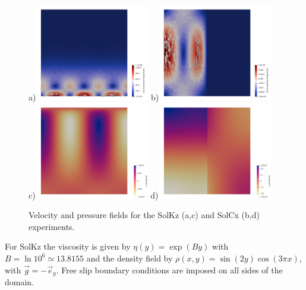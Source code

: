 \documentclass[a4paper,12pt]{article}
\begin{document}
\begin{figure}
\centering
a)\includegraphics[width=5cm]{../images/fields/vel_solkz}
b)\includegraphics[width=5cm]{../images/fields/vel_solcx}\\
c)\includegraphics[width=5cm]{../images/fields/press_solkz}
d)\includegraphics[width=5cm]{../images/fields/press_solcx}
\caption{Velocity and pressure fields for the SolKz (a,c) and SolCx (b,d) 
experiments.} \label{fig:sols}
\end{figure}

For SolKz the viscosity is given by $\eta(y)=\exp(By)$ with $B=\ln 10^6 \simeq 13.8155$ 
and the density field by $\rho(x,y)=\sin(2y) \cos(3\pi x)$, with 
$\vec{g}=-\vec{e}_y$. 
Free slip boundary conditions are imposed on all sides of the domain.
\end{document}
